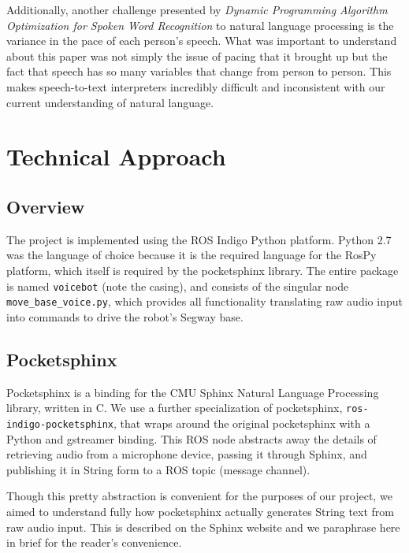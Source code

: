 \documentclass{article}
\begin{document}
\vspace{5mm}

\noindent Additionally, another challenge presented by \textit{Dynamic Programming Algorithm Optimization for Spoken Word Recognition} to natural language processing is the variance in the pace of each person's speech. What was important to understand about this paper was not simply the issue of pacing that it brought up but the fact that speech has so many variables that change from person to person. This makes speech-to-text interpreters incredibly difficult and inconsistent with our current understanding of natural language.\par

\section{Technical Approach}

\subsection{Overview}
The project is implemented using the ROS Indigo Python platform. Python 2.7 was the language of choice because it is the required language for the RosPy platform, which itself is required by the pocketsphinx library. The entire package is named \texttt{voicebot} (note the casing), and consists of the singular node \texttt{move\_base\_voice.py}, which provides all functionality translating raw audio input into commands to drive the robot's Segway base.

\subsection{Pocketsphinx}
Pocketsphinx is a binding for the CMU Sphinx Natural Language Processing library, written in C.
We use a further specialization of pocketsphinx, \texttt{ros-indigo-pocketsphinx}, that wraps around the original pocketsphinx with a Python and gstreamer binding. This ROS node abstracts away the details of retrieving audio from a microphone device, passing it through Sphinx, and publishing it in String form to a ROS topic (message channel).\par

\vspace{5mm}

\noindent Though this pretty abstraction is convenient for the purposes of our project, we aimed to understand fully how pocketsphinx actually generates String text from raw audio input. This is described on the Sphinx website and we paraphrase here in brief for the reader's convenience.\par
\end{document}
